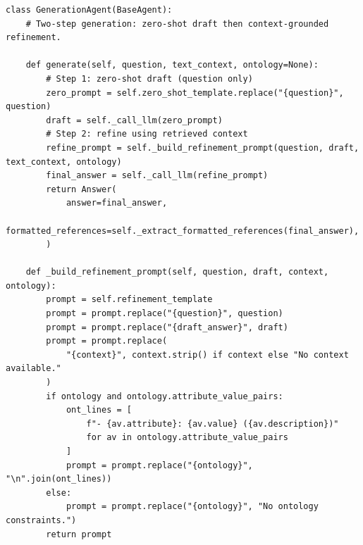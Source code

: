 \begin{lstlisting}[style=pythonstyle,
caption={Generation Agent: \texttt{generate} and
\texttt{\_build\_refinement\_prompt} methods.},
label={lst:code-generation}]
class GenerationAgent(BaseAgent):
    # Two-step generation: zero-shot draft then context-grounded refinement.

    def generate(self, question, text_context, ontology=None):
        # Step 1: zero-shot draft (question only)
        zero_prompt = self.zero_shot_template.replace("{question}", question)
        draft = self._call_llm(zero_prompt)
        # Step 2: refine using retrieved context
        refine_prompt = self._build_refinement_prompt(question, draft, text_context, ontology)
        final_answer = self._call_llm(refine_prompt)
        return Answer(
            answer=final_answer,
            formatted_references=self._extract_formatted_references(final_answer),
        )

    def _build_refinement_prompt(self, question, draft, context, ontology):
        prompt = self.refinement_template
        prompt = prompt.replace("{question}", question)
        prompt = prompt.replace("{draft_answer}", draft)
        prompt = prompt.replace(
            "{context}", context.strip() if context else "No context available."
        )
        if ontology and ontology.attribute_value_pairs:
            ont_lines = [
                f"- {av.attribute}: {av.value} ({av.description})"
                for av in ontology.attribute_value_pairs
            ]
            prompt = prompt.replace("{ontology}", "\n".join(ont_lines))
        else:
            prompt = prompt.replace("{ontology}", "No ontology constraints.")
        return prompt
\end{lstlisting}
